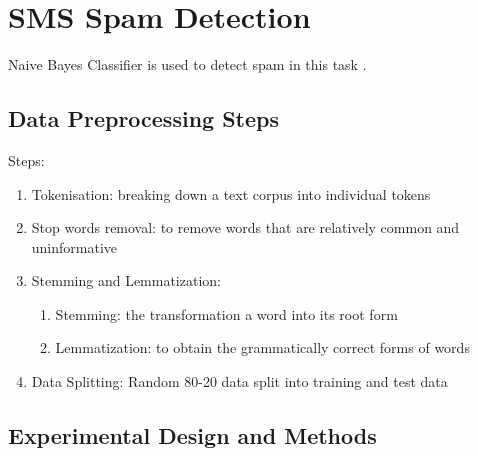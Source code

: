 \section{SMS Spam Detection}

Naive Bayes Classifier is used to detect spam in this task \cite{raschka2014naive}.

\subsection{Data Preprocessing Steps}

Steps:
\begin{enumerate}
    \item Tokenisation: breaking down a text corpus into individual tokens
    \item Stop words removal: to remove words that are relatively common and uninformative
    \item Stemming and Lemmatization: 
    \begin{enumerate}
        \item Stemming: the transformation a word into its root form
        \item Lemmatization: to obtain the grammatically correct forms of words
    \end{enumerate}
    \item Data Splitting: Random 80-20 data split into training and test data
\end{enumerate}




\subsection{Experimental Design and Methods}

